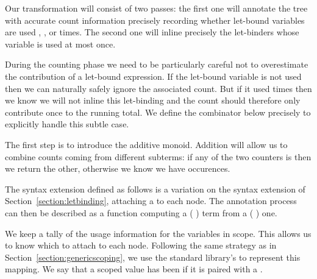 Our transformation will consist of two passes: the first one will annotate
the tree with accurate count information precisely recording whether
let-bound variables are used , , or  times.
The second one will inline precisely the let-binders whose variable is
used at most once.

During the counting phase we need to be particularly careful not to overestimate
the contribution of a let-bound expression. If the let-bound variable is not used
then we can naturally safely ignore the associated count. But if it used 
times then we know we will not inline this let-binding and the count should
therefore only contribute once to the running total. We define the 
combinator below precisely to explicitly handle this
subtle case.

The first step is to introduce the  additive monoid. Addition will
allow us to combine counts coming from different subterms: if any of the two
counters is  then we return the other, otherwise we know we have
 occurences.

\noindent
\begin{minipage}{\textwidth}
  \begin{minipage}{0.45\textwidth}
  \end{minipage}
  \begin{minipage}{0.45\textwidth}
  \end{minipage}
\end{minipage}

The syntax extension  defined as follows is
a variation on the  syntax extension of Section~\ref{section:letbinding},
attaching a  to each  node. The annotation process
can then be described as a function computing a
{(  )} term from a {(  )} one.

\begin{agdasnippet}
\end{agdasnippet}

We keep a tally of the usage information for the variables in scope. This
allows us to know which  to attach to each  node.
Following the same strategy as in Section~\ref{section:genericscoping},
we use the standard library's  to represent this mapping. We say
that a scoped value has been  if it is paired with a .

